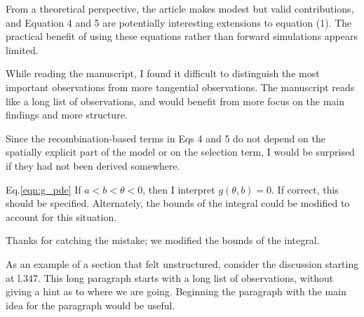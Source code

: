 \reply
{}

\begin{point}{}
    From a theoretical perspective, the article makes modest but valid contributions, and  Equation 4 and 5 are potentially interesting extensions to equation (1). The practical benefit of using these equations rather than forward simulations appears limited.
\end{point}

\reply
{}

\begin{point}{}
    While reading the manuscript, I found it difficult to distinguish the most important observations from more tangential observations. The manuscript reads like a long list of observations, and would benefit from more focus on the main findings and more structure.
\end{point}

\reply

\begin{point}{}
Since the recombination-based terms in Eqs 4 and 5 do not depend on the spatially explicit part of the model or on the selection term, I would be surprised if they had not been derived somewhere.
\end{point}

\reply
{}

\begin{point}{Eq.\ref{eqn:g_pde}}
If $a<b<\theta<0$, then I interpret $g(\theta,b) = 0$. If correct, this should be specified.  Alternately, the bounds of the integral could be modified to account for this situation.
\end{point}

\reply
Thanks for catching the mistake; we modified the bounds of the integral.

\begin{point}{}
As an example of a section that felt unstructured, consider the discussion starting at l.347.  This long paragraph starts with a long list of observations, without giving a hint as to where we are going. Beginning the paragraph with the main idea for the paragraph would be useful.
\end{point}

